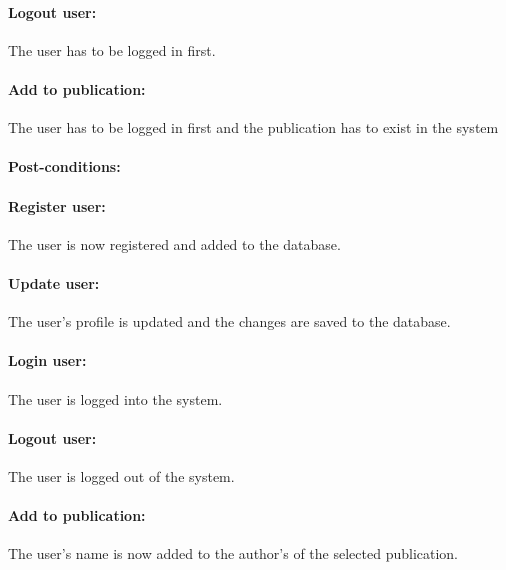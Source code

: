 \documentclass{article}
\begin{document}
				\paragraph{Logout user:} The user has to be logged in first.
				\paragraph{Add to publication:} The user has to be logged in first and the publication has to exist in the system
				\paragraph{Post-conditions:}
				\paragraph{Register user:} The user is now registered and added to the database.
				\paragraph{Update user:} The user's profile is updated and the changes are saved to the database.
				\paragraph{Login user:} The user is logged into the system.
				\paragraph{Logout user:} The user is logged out of the system.
				\paragraph{Add to publication:} The user's name is now added to the author's of the selected publication.
\end{document}
